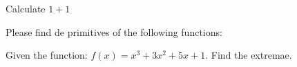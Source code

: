 \documentclass[a4paper,english,addpoints,mimicwordtwentyten]{tisdexam}
\begin{document}
\makecoverpage


\begin{questions}

\question[10]
Calculate $1+1$

\question
Please find de primitives of the following functions:

\question[20]
Given the function: $\displaystyle f(x) = x^3 + 3x^2 + 5x + 1$. Find the extremae.

\end{questions}
\end{document}
